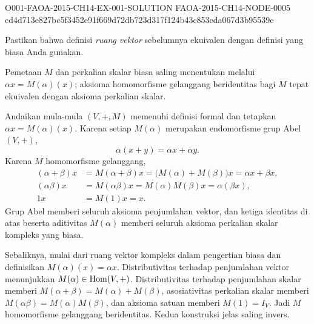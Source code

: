 \begin{o001solution}
  {O001-FAOA-2015-CH14-EX-001-SOLUTION}
  {FAOA-2015-CH14-NODE-0005}
  {cd4d713e827bc5f3452e91f669d72db723d317f124b43c853eda067d3b95539e}
\begin{o001statement}
Pastikan bahwa definisi \emph{ruang vektor} sebelumnya ekuivalen
dengan definisi yang biasa Anda gunakan.
\end{o001statement}
\begin{o001answer}
Pemetaan $M$ dan perkalian skalar biasa saling menentukan melalui
$\alpha x=M(\alpha)(x)$; aksioma homomorfisme gelanggang beridentitas bagi
$M$ tepat ekuivalen dengan aksioma perkalian skalar.
\end{o001answer}
\begin{o001proof}
Andaikan mula-mula $(V,+,M)$ memenuhi definisi formal dan tetapkan
$\alpha x=M(\alpha)(x)$. Karena setiap $M(\alpha)$ merupakan endomorfisme
grup Abel~$(V,+)$,
\[
 \alpha(x+y)=\alpha x+\alpha y.
\]
Karena $M$ homomorfisme gelanggang,
\begin{align*}
 (\alpha+\beta)x
 &=M(\alpha+\beta)x
  =\bigl(M(\alpha)+M(\beta)\bigr)x
  =\alpha x+\beta x,\\
 (\alpha\beta)x
 &=M(\alpha\beta)x
  =M(\alpha)M(\beta)x
  =\alpha(\beta x),\\
 1x&=M(1)x=x.
\end{align*}
Grup Abel memberi seluruh aksioma penjumlahan vektor, dan ketiga identitas di
atas beserta aditivitas $M(\alpha)$ memberi seluruh aksioma perkalian skalar
kompleks yang biasa.

Sebaliknya, mulai dari ruang vektor kompleks dalam pengertian biasa dan
definisikan $M(\alpha)(x)=\alpha x$. Distributivitas terhadap penjumlahan
vektor menunjukkan $M(\alpha)\in\operatorname{Hom}(V,+)$. Distributivitas terhadap
penjumlahan skalar memberi $M(\alpha+\beta)=M(\alpha)+M(\beta)$,
asosiativitas perkalian skalar memberi
$M(\alpha\beta)=M(\alpha)M(\beta)$, dan aksioma satuan memberi
$M(1)=I_V$. Jadi $M$ homomorfisme gelanggang beridentitas. Kedua konstruksi
jelas saling invers.
\end{o001proof}
\end{o001solution}

